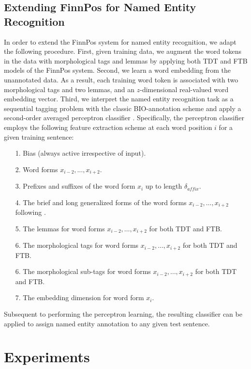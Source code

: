 \documentclass[11pt]{article}
\begin{document}
\subsection{Extending FinnPos for Named Entity Recognition}

In order to extend the FinnPos system for named entity recognition, we adapt the following procedure. First, given training data, we augment the word tokens in the data with morphological tags and lemmas by applying both TDT and FTB models of the FinnPos system. Second, we learn a word embedding from the unannotated data. As a result, each training word token is associated with two morphological tags and two lemmas, and an $z$-dimensional real-valued word embedding vector. Third, we interpret the named entity recognition task as a sequential tagging problem with the classic BIO-annotation scheme and apply a second-order averaged perceptron classifier \citep{collins2003}. Specifically, the perceptron classifier employs the following feature extraction scheme at each word position $i$ for a given training sentence:

\begin{itemize}
\item[1.] Bias (always active irrespective of input).
\item[2.] Word forms $x_{i-2}, \dots, x_{i+2}$.
\item[3.] Prefixes and suffixes of the word form $x_i$ up to length $\delta_{affix}$.
\item[4.] The brief and long generalized forms of the word forms $x_{i-2}, \dots, x_{i+2}$ following \citet{collins2002}.
\item[5.] The lemmas for word forms $x_{i-2}, \dots, x_{i+2}$ for both TDT and FTB. 
\item[6.] The morphological tags for word forms $x_{i-2}, \dots, x_{i+2}$ for both TDT and FTB. 
\item[6.] The morphological sub-tags for word forms $x_{i-2}, \dots, x_{i+2}$ for both TDT and FTB. 
\item[7.] The embedding dimension for word form $x_i$. 
\end{itemize}

Subsequent to performing the perceptron learning, the resulting classifier can be applied to assign named entity annotation to any given test sentence.


\section{Experiments}
\label{sec: experiments}
\end{document}
